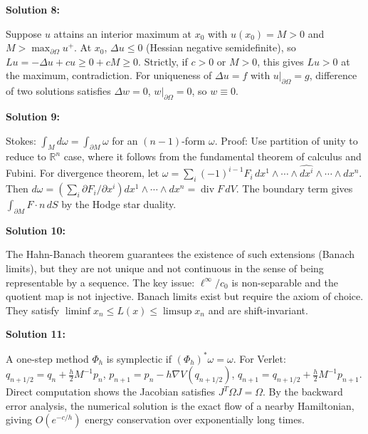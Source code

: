 \documentclass[12pt,a4paper]{exam}
\begin{document}
\vspace{0.5cm}

\textbf{Solution 8:}

Suppose $u$ attains an interior maximum at $x_0$ with $u(x_0) = M > 0$ and $M > \max_{\partial\Omega} u^+$. At $x_0$, $\Delta u \leq 0$ (Hessian negative semidefinite), so $Lu = -\Delta u + c u \geq 0 + cM \geq 0$. Strictly, if $c>0$ or $M>0$, this gives $Lu > 0$ at the maximum, contradiction. For uniqueness of $\Delta u = f$ with $u|_{\partial\Omega} = g$, difference of two solutions satisfies $\Delta w = 0$, $w|_{\partial\Omega} = 0$, so $w \equiv 0$.

\vspace{0.5cm}

\textbf{Solution 9:}

Stokes: $\int_M d\omega = \int_{\partial M} \omega$ for an $(n-1)$-form $\omega$. Proof: Use partition of unity to reduce to $\mathbb{R}^n$ case, where it follows from the fundamental theorem of calculus and Fubini. For divergence theorem, let $\omega = \sum_i (-1)^{i-1} F_i \, dx^1 \wedge \cdots \wedge \widehat{dx^i} \wedge \cdots \wedge dx^n$. Then $d\omega = (\sum_i \partial F_i/\partial x^i) dx^1 \wedge \cdots \wedge dx^n = \operatorname{div} F \, dV$. The boundary term gives $\int_{\partial M} F \cdot n \, dS$ by the Hodge star duality.

\vspace{0.5cm}

\textbf{Solution 10:}

The Hahn-Banach theorem guarantees the existence of such extensions (Banach limits), but they are not unique and not continuous in the sense of being representable by a sequence. The key issue: $\ell^\infty / c_0$ is non-separable and the quotient map is not injective. Banach limits exist but require the axiom of choice. They satisfy $\liminf x_n \leq L(x) \leq \limsup x_n$ and are shift-invariant.

\vspace{0.5cm}

\textbf{Solution 11:}

A one-step method $\Phi_h$ is symplectic if $(\Phi_h)^*\omega = \omega$. For Verlet: $q_{n+1/2} = q_n + \frac{h}{2} M^{-1} p_n$, $p_{n+1} = p_n - h \nabla V(q_{n+1/2})$, $q_{n+1} = q_{n+1/2} + \frac{h}{2} M^{-1} p_{n+1}$. Direct computation shows the Jacobian satisfies $J^T \Omega J = \Omega$. By the backward error analysis, the numerical solution is the exact flow of a nearby Hamiltonian, giving $O(e^{-c/h})$ energy conservation over exponentially long times.
\end{document}
